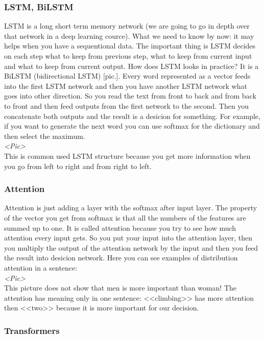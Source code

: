 \subsubsection*{LSTM, BiLSTM}

LSTM is a long short term memory network (we are going to go in depth over that network in a deep learning cource). What we need to know by now: it may helps when you have a sequentional data. The important thing is LSTM decides on each step what to keep from previous step, what to keep from current input and what to keep from current output. How does LSTM looks in practice? It is a BiLSTM (bidirectional LSTM) [pic.]. Every word represented as a vector feeds into the first LSTM network and then you have another LSTM network what goes into other direction. So you read the text from front to back and from back to front and then feed outputs from the first network to the second. Then you concatenate both outputs and the result is a desicion for something. For example, if you want to generate the next word you can use softmax for the dictionary and then select the maximum.\\
{\it <Pic>}\\
This is common used LSTM structure because you get more information when you go from left to right and from right to left.

\subsubsection*{Attention}

Attention is just adding a layer with the softmax after input layer. The property of the vector you get from softmax is that all the numbers of the features are summed up to one. It is called attention because you try to see how much attention every input gets. So you put your input into the attention layer, then you multiply the output of the attention network by the input and then you feed the result into desicion network. Here you can see examples of distribution attention in a sentence:\\
{\it <Pic>}\\
This picture does not show that men is more important than woman! The attention has meaning only in one sentence: <<climbing>> has more attention then <<two>> because it is more important for our decision. 

\subsubsection*{Transformers}

